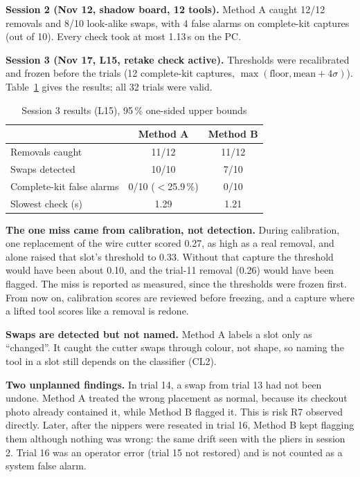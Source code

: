 \textbf{Session 2 (Nov 12, shadow board, 12 tools).} Method A caught 12/12
removals and 8/10 look-alike swaps, with 4 false alarms on complete-kit
captures (out of 10). Every check took at most 1.13\,s on the PC.

\textbf{Session 3 (Nov 17, L15, retake check active).} Thresholds were
recalibrated and frozen before the trials (12 complete-kit captures,
$\max(\text{floor}, \text{mean} + 4\sigma)$). Table~\ref{tab:l15} gives the
results; all 32 trials were valid.

\begin{table}[!t]
\centering
\footnotesize
\caption{Session 3 results (L15), 95\,\% one-sided upper bounds}
\label{tab:l15}
\begin{tabular}{@{}lcc@{}}
\toprule
 & Method A & Method B \\
\midrule
Removals caught      & 11/12 & 11/12 \\
Swaps detected       & 10/10 & 7/10 \\
Complete-kit false alarms & 0/10 ($<$25.9\,\%) & 0/10 \\
Slowest check (s)    & 1.29 & 1.21 \\
\bottomrule
\end{tabular}
\end{table}

\textbf{The one miss came from calibration, not detection.} During
calibration, one replacement of the wire cutter scored 0.27, as high as a
real removal, and alone raised that slot's threshold to 0.33. Without that
capture the threshold would have been about 0.10, and the trial-11 removal
(0.26) would have been flagged. The miss is reported as measured, since the
thresholds were frozen first. From now on, calibration scores are reviewed
before freezing, and a capture where a lifted tool scores like a removal is
redone.

\textbf{Swaps are detected but not named.} Method A labels a slot only as
``changed''. It caught the cutter swaps through colour, not shape, so
naming the tool in a slot still depends on the classifier (CL2).

\textbf{Two unplanned findings.} In trial 14, a swap from trial 13 had not
been undone. Method A treated the wrong placement as normal, because its
checkout photo already contained it, while Method B flagged it. This is
risk R7 observed directly. Later, after the nippers were reseated in trial
16, Method B kept flagging them although nothing was wrong: the same drift
seen with the pliers in session 2. Trial 16 was an operator error (trial 15
not restored) and is not counted as a system false alarm.

